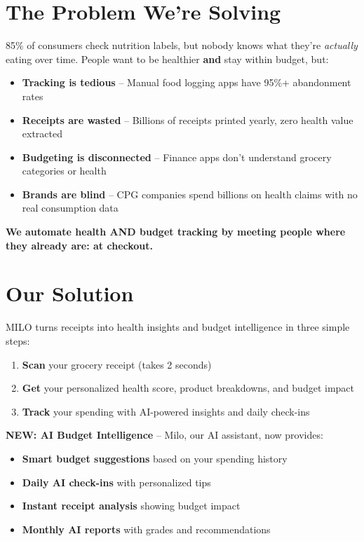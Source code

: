 \documentclass[11pt,a4paper]{report}
\begin{document}
\section{The Problem We're Solving}

85\% of consumers check nutrition labels, but nobody knows what they're \textit{actually} eating over time. People want to be healthier \textbf{and} stay within budget, but:

\begin{itemize}[leftmargin=2em, itemsep=4pt]
    \item \textbf{Tracking is tedious} -- Manual food logging apps have 95\%+ abandonment rates
    \item \textbf{Receipts are wasted} -- Billions of receipts printed yearly, zero health value extracted
    \item \textbf{Budgeting is disconnected} -- Finance apps don't understand grocery categories or health
    \item \textbf{Brands are blind} -- CPG companies spend billions on health claims with no real consumption data
\end{itemize}

\textbf{We automate health AND budget tracking by meeting people where they already are: at checkout.}

\section{Our Solution}

MILO turns receipts into health insights and budget intelligence in three simple steps:

\begin{enumerate}[leftmargin=2em, itemsep=4pt]
    \item \textbf{Scan} your grocery receipt (takes 2 seconds)
    \item \textbf{Get} your personalized health score, product breakdowns, and budget impact
    \item \textbf{Track} your spending with AI-powered insights and daily check-ins
\end{enumerate}

\textbf{NEW: AI Budget Intelligence} -- Milo, our AI assistant, now provides:
\begin{itemize}[leftmargin=2em, itemsep=3pt]
    \item \textbf{Smart budget suggestions} based on your spending history
    \item \textbf{Daily AI check-ins} with personalized tips
    \item \textbf{Instant receipt analysis} showing budget impact
    \item \textbf{Monthly AI reports} with grades and recommendations
\end{itemize}
\end{document}
